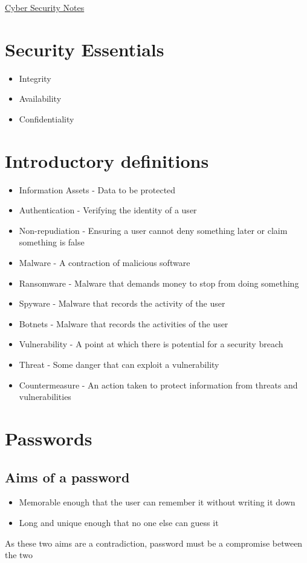 \documentclass{article}[18pt]
\begin{document}
\begin{center}
\underline{\huge Cyber Security Notes}
\end{center}
\section{Security Essentials}
\begin{itemize}
\item Integrity
\item Availability 
\item Confidentiality 
\end{itemize}
\section{Introductory definitions}
\begin{itemize}
\item Information Assets - Data to be protected
\item Authentication - Verifying the identity of a user
\item Non-repudiation - Ensuring a user cannot deny something later or claim something is false
\item Malware - A contraction of malicious software
\item Ransomware - Malware that demands money to stop from doing something
\item Spyware - Malware that records the activity of the user
\item Botnets - Malware that records the activities of the user
\item Vulnerability - A point at which there is potential for a security breach
\item Threat - Some danger that can exploit a vulnerability
\item Countermeasure - An action taken to protect information from threats and vulnerabilities
\end{itemize}
\section{Passwords}
\subsection{Aims of a password}
\begin{itemize}
\item Memorable enough that the user can remember it without writing it down
\item Long and unique enough that no one else can guess it
\end{itemize}
As these two aims are a contradiction, password must be a compromise between the two
\end{document}
